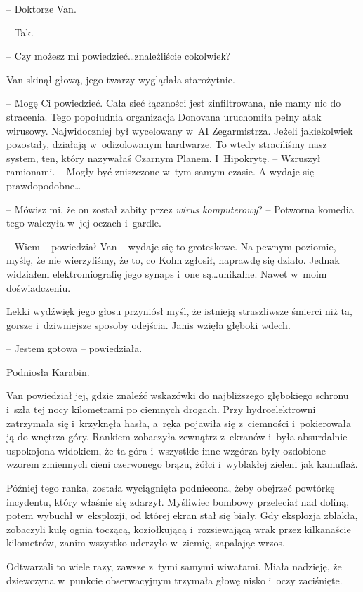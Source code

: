\documentclass[oneside,polish,11pt,sfheadings]{mwbk}
\begin{document}
-- Doktorze Van.

-- Tak.

-- Czy możesz mi powiedzieć\ldots znaleźliście cokolwiek?

Van skinął głową, jego twarzy wyglądała starożytnie. 

-- Mogę Ci
powiedzieć. Cała sieć łączności jest zinfiltrowana, nie mamy nic do
stracenia. Tego popołudnia organizacja Donovana uruchomiła pełny atak
wirusowy. Najwidoczniej był wycelowany w~AI Zegarmistrza. Jeżeli
jakiekolwiek pozostały, działają w~odizolowanym hardwarze. To wtedy
straciliśmy nasz system, ten, który nazywałaś Czarnym Planem. I~Hipokrytę. -- Wzruszył ramionami. -- Mogły być zniszczone w~tym samym
czasie. A wydaje się prawdopodobne\ldots

-- Mówisz mi, że on został zabity przez \emph{wirus komputerowy}? -- Potworna komedia tego walczyła w~jej oczach i~gardle.

-- Wiem -- powiedział Van -- wydaje się to groteskowe. Na pewnym poziomie,
myślę, że nie wierzyliśmy, że to, co Kohn zgłosił, naprawdę się działo.
Jednak widziałem elektromiografię jego synaps i~one są\ldots unikalne.
Nawet w~moim doświadczeniu.

Lekki wydźwięk jego głosu przyniósł myśl, że istnieją straszliwsze
śmierci niż ta, gorsze i~dziwniejsze sposoby odejścia. Janis wzięła
głęboki wdech.

-- Jestem gotowa -- powiedziała.

Podniosła Karabin.

Van powiedział jej, gdzie znaleźć wskazówki do najbliższego głębokiego
schronu i~szła tej nocy kilometrami po ciemnych drogach. Przy
hydroelektrowni zatrzymała się i~krzyknęła hasła, a~ręka pojawiła się z~ciemności i~pokierowała ją do wnętrza góry. Rankiem zobaczyła zewnątrz z~ekranów i~była absurdalnie uspokojona widokiem, że ta góra i~wszystkie
inne wzgórza były ozdobione wzorem zmiennych cieni czerwonego brązu,
żółci i~wyblakłej zieleni jak kamuflaż.

Później tego ranka, została wyciągnięta podniecona, żeby obejrzeć
powtórkę incydentu, który właśnie się zdarzył. Myśliwiec bombowy
przeleciał nad doliną, potem wybuchł w~eksplozji, od której ekran stał
się biały. Gdy eksplozja zblakła, zobaczyli kulę ognia toczącą,
koziołkującą i~rozsiewającą wrak przez kilkanaście kilometrów, zanim
wszystko uderzyło w~ziemię, zapalając wrzos.

Odtwarzali to wiele razy, zawsze z~tymi samymi wiwatami. Miała nadzieję,
że dziewczyna w~punkcie obserwacyjnym trzymała głowę nisko i~oczy
zaciśnięte.
\end{document}
